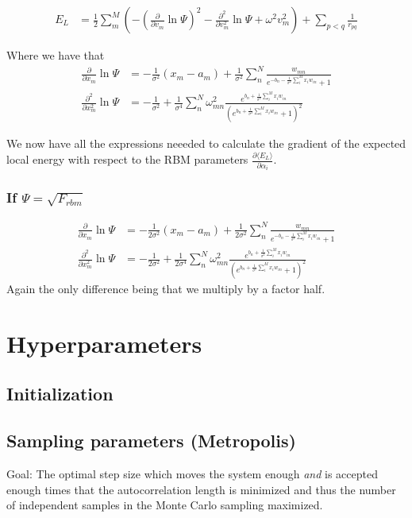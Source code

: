 \documentclass[twoside,english]{uiofysmaster}
\begin{document}
\begin{align}
	E_L &=
	\frac{1}{2} \sum_m^M (-(\frac{\partial}{\partial v_m} \ln\Psi)^2 -\frac{\partial^2}{\partial v_m^2} \ln\Psi + \omega^2 v_m^2)  + \sum_{p<q} \frac{1}{r_{pq}}
\end{align}

Where we have that
\begin{align}
	\frac{\partial}{\partial x_m} \ln\Psi
	&= - \frac{1}{\sigma^2}(x_m - a_m) + \frac{1}{\sigma^2} \sum_n^N \frac{w_{mn}}{e^{-b_n - \frac{1}{\sigma^2}\sum_i^M x_i w_{in}} + 1} \\
	\frac{\partial^2}{\partial x_m^2} \ln\Psi
	&= - \frac{1}{\sigma^2} + \frac{1}{\sigma^4}\sum_n^N \omega_{mn}^2 \frac{e^{b_n + \frac{1}{\sigma^2}\sum_i^M x_i w_{in}}}{(e^{b_n + \frac{1}{\sigma^2}\sum_i^M x_i w_{in}} + 1)^2}
\end{align}


We now have all the expressions neeeded to calculate the gradient of the expected local energy with respect to the RBM parameters $\frac{\partial \langle E_L \rangle}{\partial \alpha_i}$.

\subsubsection{If $\Psi = \sqrt{F_{rbm}}$}
\begin{align}
	\frac{\partial}{\partial x_m} \ln\Psi
	&= - \frac{1}{2\sigma^2}(x_m - a_m) + \frac{1}{2\sigma^2} \sum_n^N
 	\frac{w_{mn}}{e^{-b_n-\frac{1}{\sigma^2}\sum_i^M x_i w_{in}} + 1}
	\\
	\frac{\partial^2}{\partial x_m^2} \ln\Psi
	&= - \frac{1}{2\sigma^2} + \frac{1}{2\sigma^4}\sum_n^N \omega_{mn}^2 \frac{e^{b_n + \frac{1}{\sigma^2}\sum_i^M x_i w_{in}}}{(e^{b_n + \frac{1}{\sigma^2}\sum_i^M x_i w_{in}} + 1)^2}
\end{align}
Again the only difference being that we multiply by a factor half.

\section{Hyperparameters} 
\subsection{Initialization}
\subsection{Sampling parameters (Metropolis)}
Goal: The optimal step size which moves the system enough \textit{and} is accepted enough times that the autocorrelation length is minimized and thus the number of independent samples in the Monte Carlo sampling maximized.
\end{document}
